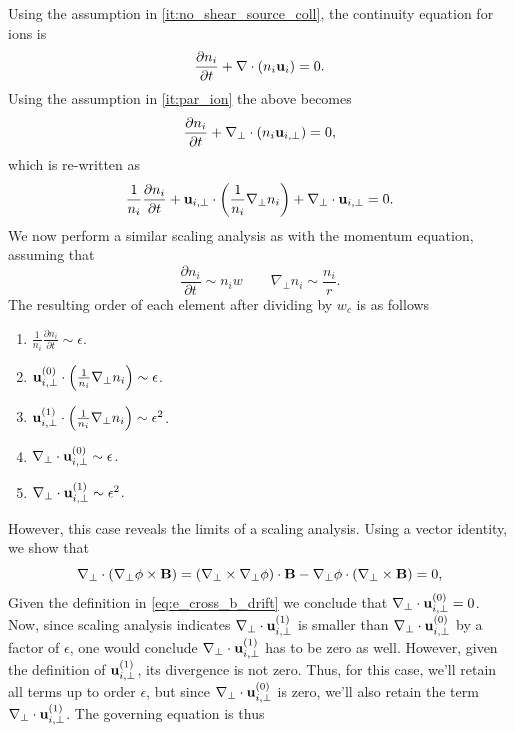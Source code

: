 \documentclass[oneside,a4paper,11pt]{report}
\begin{document}
Using the assumption in \cref{it:no_shear_source_coll}, the continuity equation for ions is
\begin{equation}
    \frac{\partial n_i}{\partial t} + \nabla \cdot (n_i \mathbf{u}_i) = 0.
\end{equation}
Using the assumption in \cref{it:par_ion} the above becomes
\begin{equation}
    \frac{\partial n_i}{\partial t} + \nabla_\perp \cdot (n_i \mathbf{u}_{i,\perp}) = 0,
\end{equation}
which is re-written as
\begin{equation}
    \frac{1}{n_i} \frac{\partial n_i}{\partial t} + \mathbf{u}_{i,\perp} \cdot \left ( \frac{1}{n_i} \nabla_\perp n_i \right ) + \nabla_\perp \cdot \mathbf{u}_{i,\perp} = 0.
\end{equation}
We now perform a similar scaling analysis as with the momentum equation, assuming that
\begin{equation}
    \frac{\partial n_i}{\partial t} \sim n_i w \qquad \nabla_\perp n_i \sim \frac{n_i}{r}.
\end{equation}
The resulting order of each element after dividing by $w_c$ is as follows
\begin{enumerate}
    \item $\frac{1}{n_i} \frac{\partial n_i}{\partial t} \sim \epsilon$.
    \item $\mathbf{u}_{i,\perp}^{(0)} \cdot \left ( \frac{1}{n_i} \nabla_\perp n_i \right ) \sim \epsilon$.
    \item $\mathbf{u}_{i,\perp}^{(1)} \cdot \left ( \frac{1}{n_i} \nabla_\perp n_i \right ) \sim \epsilon^2$.
    \item $\nabla_\perp \cdot \mathbf{u}_{i,\perp}^{(0)} \sim \epsilon$.
    \item $\nabla_\perp \cdot \mathbf{u}_{i,\perp}^{(1)} \sim \epsilon^2$.
\end{enumerate}
However, this case reveals the limits of a scaling analysis. Using a vector identity, we show that
\begin{equation}
    \nabla_\perp \cdot (\nabla_\perp \phi \times \mathbf{B}) = (\nabla_\perp \times \nabla_\perp \phi) \cdot \mathbf{B} - \nabla_\perp \phi \cdot (\nabla_\perp \times \mathbf{B}) = 0,
\end{equation}
Given the definition in \cref{eq:e_cross_b_drift} we conclude that $\nabla_\perp \cdot \mathbf{u}_{i,\perp}^{(0)} = 0$. Now, since scaling analysis indicates $\nabla_\perp \cdot \mathbf{u}_{i,\perp}^{(1)}$ is smaller than $\nabla_\perp \cdot \mathbf{u}_{i,\perp}^{(0)}$ by a factor of $\epsilon$, one would conclude $\nabla_\perp \cdot \mathbf{u}_{i,\perp}^{(1)}$ has to be zero as well. However, given the definition of $\mathbf{u}_{i,\perp}^{(1)}$, its divergence is not zero. Thus, for this case, we'll retain all terms up to order $\epsilon$, but since $\nabla_\perp \cdot \mathbf{u}_{i,\perp}^{(0)}$ is zero, we'll also retain the term $\nabla_\perp \cdot \mathbf{u}_{i,\perp}^{(1)}$. The governing equation is thus
\end{document}
